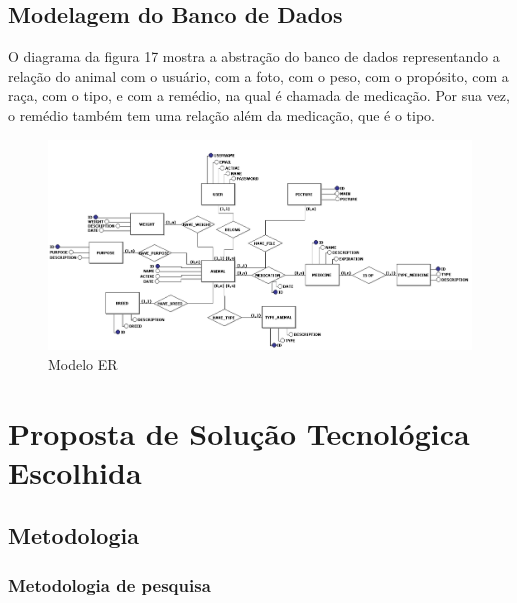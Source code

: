 \documentclass[12pt]{article}
\begin{document}
\begin{titlepage}
\begin{center}
\begin{figure}[!h]
\begin{center}
	\end{center}
\end{figure}

\newpage

\subsection{Modelagem do Banco de Dados}

O diagrama da figura 17 mostra a abstração do banco de dados representando a relação do animal com o usuário, com a foto, com o peso, com o propósito, com a raça, com o tipo, e com a remédio, na qual é chamada de medicação. Por sua vez, o remédio também tem uma relação além da medicação, que é o tipo.  

\begin{figure}[!h]
	\begin{center}
		\caption{Modelo ER}
		\includegraphics[width=6in]{img/erdoboi.jpeg}


	\end{center}
\end{figure}

\newpage

\section{Proposta de Solução Tecnológica Escolhida}

\subsection{Metodologia}

\subsubsection{Metodologia de pesquisa}


\end{center}
\end{titlepage}
\end{document}
